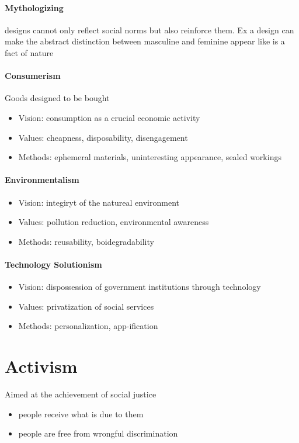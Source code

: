 \documentclass{article}
\begin{document}
\paragraph{Mythologizing}
\label{par:mythologizing}
designs cannot only reflect social norms but also reinforce them. Ex a design can make the abstract distinction between masculine and feminine appear like is a fact of nature

\paragraph{Consumerism}
\label{par:consumerism}
Goods designed to be bought
\begin{itemize}
	\item Vision: consumption as a crucial economic activity
	\item Values: cheapness, disposability, disengagement
	\item Methods: ephemeral materials, uninteresting appearance, sealed workings
\end{itemize}

\paragraph{Environmentalism}
\label{par:environmentalism}
\begin{itemize}
	\item Vision: integiryt of the natureal environment
	\item Values: pollution reduction, environmental awareness
	\item Methods: reusability, boidegradability
\end{itemize}

\paragraph{Technology Solutionism}
\label{par:technology_solutionism}
\begin{itemize}
	\item Vision: dispossession of government institutions through technology
	\item Values: privatization of social services
	\item Methods: personalization, app-ification
\end{itemize}

\section*{Activism}
\label{sec:activism}
Aimed at the achievement of social justice
\begin{itemize}
	\item people receive what is due to them
	\item people are free from wrongful discrimination
\end{itemize}
\end{document}
